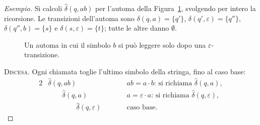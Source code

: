 \documentclass[a4paper, 11pt, oneside]{book}
\theoremstyle{formale}
\newenvironment{esempio}
    {\begin{proof}[\textit{Esempio}]\renewcommand{\qedsymbol}{$\diamond$}}
    {\end{proof}}
\begin{document}
    \begin{esempio}
        Si calcoli $\hat{\delta}(q, ab)$ per l'automa della
        Figura~\ref{fig:enfa-stack}, svolgendo per intero la ricorsione. Le transizioni
        dell'automa sono $\delta(q, a) = \{q'\}$, $\delta(q', \varepsilon) = \{q''\}$,
        $\delta(q'', b) = \{s\}$ e $\delta(s, \varepsilon) = \{t\}$; tutte le altre danno
        $\emptyset$.

        \begin{figure}[H]
            \centering
            \caption{Un automa in cui il simbolo $b$ si pu\`o leggere solo dopo una
                $\varepsilon$-transizione.}
            \label{fig:enfa-stack}
        \end{figure}

        \textsc{Discesa}. Ogni chiamata toglie l'ultimo simbolo della stringa, fino al caso
        base:
        \begin{alignat*}{2}
            &\hat{\delta}(q, ab) & \qquad & ab = a \cdot b \text{: si richiama }
                \hat{\delta}(q, a), \\
            &\qquad \hat{\delta}(q, a) & & a = \varepsilon \cdot a \text{: si richiama }
                \hat{\delta}(q, \varepsilon), \\
            &\qquad\qquad \hat{\delta}(q, \varepsilon) & & \text{caso base.}
        \end{alignat*}


\end{esempio}
\end{document}
